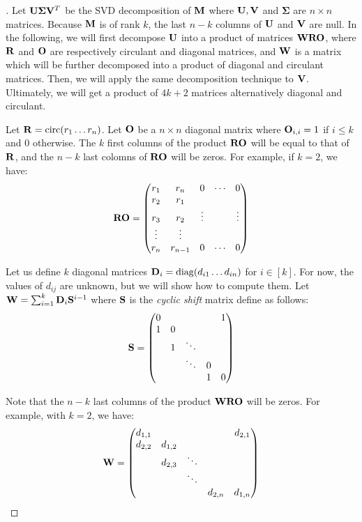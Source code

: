 \begin{proof}[]
Let $\mathbf{U} \mathbf{\Sigma} \mathbf{V}^{T}$ be the SVD decomposition of $\mathbf{M}$ where $\mathbf{U},\mathbf{V}$ and $\mathbf{\Sigma}$ are $n \times n$ matrices.
Because $\mathbf{M}$ is of rank $k$, the last $n-k$ columns of $\mathbf{U}$ and $\mathbf{V}$ are null.
In the following, we will first decompose $\mathbf{U}$ into a product of matrices $\mathbf{W}\mathbf{R}\mathbf{O}$, where $\mathbf{R}$ and $\mathbf{O}$ are respectively circulant and diagonal matrices, and $\mathbf{W}$ is a matrix which will be further decomposed into a product of diagonal and circulant matrices.
Then, we will apply the same decomposition technique to $\mathbf{V}$.
Ultimately, we will get a product of $4k+2$ matrices alternatively diagonal and circulant.  

Let $\mathbf{R} = \mathrm{circ}(r_{1}\ldots r_{n})$. Let $\mathbf{O}$ be a $n \times n$ diagonal matrix where $\mathbf{O}_{i,i} = 1$ if $i \le k$ and $0$ otherwise. The $k$ first columns of the product $\mathbf{R}\mathbf{O}$ will be equal to that of $\mathbf{R}$, and the $n-k$ last colomns of $\mathbf{R}\mathbf{O}$ will be zeros. For example, if $k=2$, we have: 
\begin{equation}
  \mathbf{R}\mathbf{O} = \begin{pmatrix}
  r_{1} & r_{n} & 0 & \cdots & 0\\
  r_{2} & r_{1}\\
  r_{3} & r_{2} & \vdots &  & \vdots\\
  \vdots & \vdots\\
  r_{n} & r_{n-1} & 0 & \cdots & 0
  \end{pmatrix}
\end{equation}

Let us define $k$ diagonal matrices $\mathbf{D}_{i} = \mathrm{diag}(d_{i1} \ldots d_{in})$ for $i \in [k]$.
For now, the values of $d_{ij}$ are unknown, but we will show how to compute them.
Let $\mathbf{W} = \sum_{i=1}^{k} \mathbf{D}_{i} \mathbf{S}^{i-1}$ where $\mathbf{S}$ is the \emph{cyclic shift} matrix 
define as follows:
\begin{equation}
  \mathbf{S} = \begin{pmatrix} 0 &  &  &  & 1 \\
  1 & 0 \\
   & 1 & \ddots \\
   &  & \ddots & 0 \\
   &  &  & 1 & 0
  \end{pmatrix}
\end{equation}


Note that the $n-k$ last columns of the product $\mathbf{W}\mathbf{R}\mathbf{O}$ will be zeros.
For example, with $k=2$, we have: 
\begin{equation}
  \mathbf{W} = \begin{pmatrix}
  d_{1,1} &  &  &  & d_{2,1} \\
  d_{2,2} & d_{1,2} \\
   & d_{2,3} & \ddots \\
   &  & \ddots \\
   &  &  & d_{2,n} & d_{1,n}
  \end{pmatrix}
\end{equation}


\end{proof}
